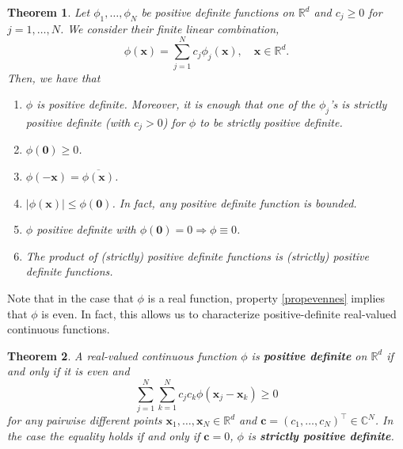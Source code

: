\documentclass[12pt]{report} %
\newtheorem{theorem}{Theorem}
\newcommand{\tmmathbf}[1]{\ensuremath{\boldsymbol{#1}}}
\newcommand{\tmstrong}[1]{\textbf{#1}}
\begin{document}
\begin{theorem}
  Let $\phi_1, \ldots, \phi_N$ be positive definite functions on
  $\mathbb{R}^d$ and $c_j \geq 0$ for $j = 1, \ldots, N$. We consider their
  finite linear combination,
  \begin{equation}
    \phi (\tmmathbf{x}) = \sum_{j = 1}^N c_j \phi_j (\tmmathbf{x}), \quad
    \tmmathbf{x} \in \mathbb{R}^d . \label{linearcombinationofpsdf}
  \end{equation}
  Then, we have that
  \begin{enumerate}
    \item $\phi$ is positive definite. Moreover, it is enough that one of the
          $\phi_j$'s is strictly positive definite (with $c_j > 0$) for $\phi$ to be
          strictly positive definite.

    \item $\phi (\tmmathbf{0}) \geq 0$.

    \item \label{propevennes}$\phi (-\tmmathbf{x}) = \overline{\phi
              (\tmmathbf{x})}$.

    \item $| \phi (\tmmathbf{x}) | \leq \phi (\tmmathbf{0})$. In fact, any
          positive definite function is bounded.

    \item $\phi$ positive definite with $\phi (\tmmathbf{0}) = 0 \Rightarrow
            \phi \equiv 0$.

    \item The product of (strictly) positive definite functions is (strictly)
          positive definite functions.
  \end{enumerate}
\end{theorem}

Note that in the case that $\phi$ is a real function, property
\eqref{propevennes} implies that $\phi$ is even. In fact, this allows us to
characterize positive-definite real-valued continuous functions.

\begin{theorem}
  A real-valued continuous function $\phi$ is {\tmstrong{positive definite}}
  on $\mathbb{R}^d$ if and only if it is even and
  \[ \sum_{j = 1}^N \sum_{k = 1}^N c_j c_k \phi (\tmmathbf{x}_j
    -\tmmathbf{x}_k) \geq 0 \]
  for any pairwise different points $\tmmathbf{x}_1, \ldots, \tmmathbf{x}_N
    \in \mathbb{R}^d$ and $\tmmathbf{c}= (c_1, \ldots, c_N)^{\top} \in
    \mathbb{C}^N$. In the case the equality holds if and only if $\tmmathbf{c}=
    0$, $\phi$ is {\tmstrong{strictly positive definite}}.
\end{theorem}
\end{document}
